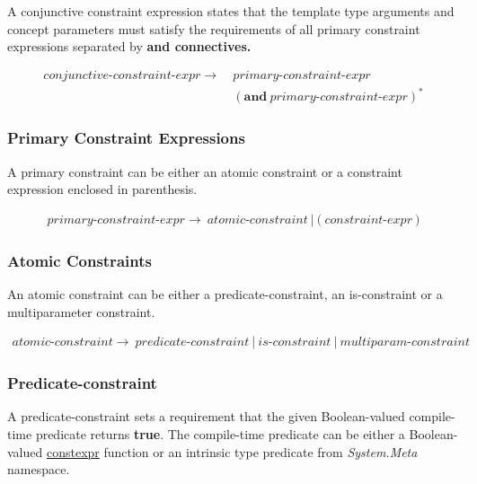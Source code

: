 \documentclass[a4paper,oneside,11pt]{article}
\begin{document}
A conjunctive constraint expression states that the template type arguments and concept parameters must satisfy
the requirements of all primary constraint expressions separated by \bf{and} connectives.

\begin{align*}
conjunctive\textrm{-}constraint\textrm{-}expr \rightarrow \> &\hyperref[primaryconstraint]{primary\textrm{-}constraint\textrm{-}expr}\\
&(\textbf{and} \> \hyperref[primaryconstraint]{primary\textrm{-}constraint\textrm{-}expr})^*
\end{align*}

\subsubsection{Primary Constraint Expressions}\label{primaryconstraint}

A primary constraint can be either an atomic constraint or a constraint expression enclosed in parenthesis.

\begin{align*}
primary\textrm{-}constraint\textrm{-}expr \rightarrow \> \hyperref[atomicconstraint]{atomic\textrm{-}constraint} \> |
\> \texttt{(} \> \hyperref[constraintexpr]{constraint\textrm{-}expr} \> \texttt{)}
\end{align*}

\subsubsection{Atomic Constraints}\label{atomicconstraint}

An atomic constraint can be either a predicate-constraint, an is-constraint or a multiparameter constraint.

\begin{align*}
atomic\textrm{-}constraint \rightarrow \> \hyperref[predicateconstraint]{predicate\textrm{-}constraint} \>
| \> \hyperref[isconstraint]{is\textrm{-}constraint} \> | \>
\hyperref[multiparamconstraint]{multiparam\textrm{-}constraint}
\end{align*}

\subsubsection{Predicate-constraint}\label{predicateconstraint}

A predicate-constraint sets a requirement that the given Boolean-valued compile-time predicate returns \textbf{true}.
The compile-time predicate can be either a Boolean-valued \hyperref[constexprfun]{constexpr} function or an intrinsic type predicate from \emph{System.Meta} namespace.
\end{document}
